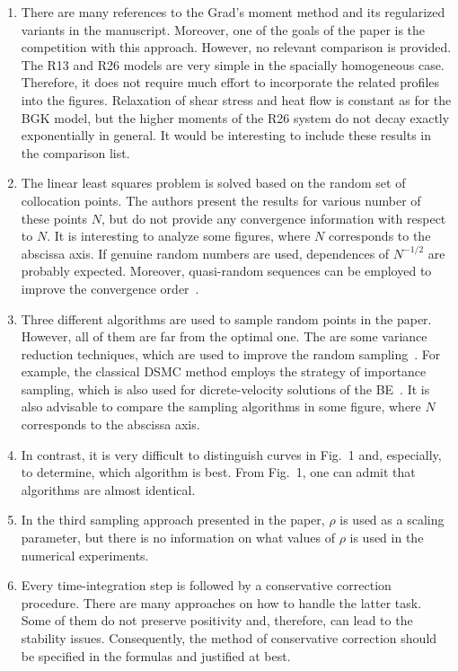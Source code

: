 \documentclass[11pt]{article}
\begin{document}
\begin{enumerate}
    \item There are many references to the Grad's moment method and its regularized variants in the manuscript.
    Moreover, one of the goals of the paper is the competition with this approach.
    However, no relevant comparison is provided. The R13 and R26 models are very simple in the spacially homogeneous case.
    Therefore, it does not require much effort to incorporate the related profiles into the figures.
    Relaxation of shear stress and heat flow is constant as for the BGK model,
    but the higher moments of the R26 system do not decay exactly exponentially in general.
    It would be interesting to include these results in the comparison list.

    \item The linear least squares problem is solved based on the random set of collocation points.
    The authors present the results for various number of these points $N$,
    but do not provide any convergence information with respect to $N$.
    It is interesting to analyze some figures, where $N$ corresponds to the abscissa axis.
    If genuine random numbers are used, dependences of $N^{-1/2}$ are probably expected.
    Moreover, quasi-random sequences can be employed to improve the convergence order~\cite{Dick2013}.

    \item Three different algorithms are used to sample random points in the paper.
    However, all of them are far from the optimal one. The are some variance reduction techniques,
    which are used to improve the random sampling~\cite{Dick2013}.
    For example, the classical DSMC method employs the strategy of importance sampling,
    which is also used for dicrete-velocity solutions of the BE~\cite{Varghese1994, Kolobov2013}.
    It is also advisable to compare the sampling algorithms in some figure, where $N$ corresponds to the abscissa axis.

    \item In contrast, it is very difficult to distinguish curves in Fig.~1 and, especially, to determine, which algorithm is best.
    From Fig.~1, one can admit that algorithms are almost identical.

    \item In the third sampling approach presented in the paper, $\rho$ is used as a scaling parameter,
    but there is no information on what values of $\rho$ is used in the numerical experiments.

    \item Every time-integration step is followed by a conservative correction procedure.
    There are many approaches on how to handle the latter task.
    Some of them do not preserve positivity and, therefore, can lead to the stability issues.
    Consequently, the method of conservative correction should be specified in the formulas
    and justified at best.


\end{enumerate}
\end{document}

